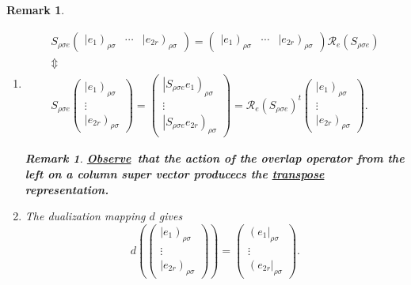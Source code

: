 \documentclass[aps,preprint]{revtex4}
\newtheorem{remark}[theorem]{Remark}
\begin{document}
\begin{remark}
\begin{enumerate}
\begin{enumerate}
\item 
\begin{gather}
S_{\rho \sigma e}\left( 
\begin{array}{ccc}
\left\vert e_{1}\right) _{\rho \sigma } & \cdots & \left\vert e_{2r}\right)
_{\rho \sigma }%
\end{array}%
\right) =\left( 
\begin{array}{ccc}
\left\vert e_{1}\right) _{\rho \sigma } & \cdots & \left\vert e_{2r}\right)
_{\rho \sigma }%
\end{array}%
\right) \mathcal{R}_{e}\left( S_{\rho \sigma e}\right) \\
\Updownarrow \\
S_{\rho \sigma e}\left( 
\begin{array}{c}
\left\vert e_{1}\right) _{\rho \sigma } \\ 
\vdots \\ 
\left\vert e_{2r}\right) _{\rho \sigma }%
\end{array}%
\right) =\left( 
\begin{array}{c}
\left\vert S_{\rho \sigma e}e_{1}\right) _{\rho \sigma } \\ 
\vdots \\ 
\left\vert S_{\rho \sigma e}e_{2r}\right) _{\rho \sigma }%
\end{array}%
\right) =\mathcal{R}_{e}\left( S_{\rho \sigma e}\right) ^{t}\left( 
\begin{array}{c}
\left\vert e_{1}\right) _{\rho \sigma } \\ 
\vdots \\ 
\left\vert e_{2r}\right) _{\rho \sigma }%
\end{array}%
\right) .
\end{gather}

\begin{remark}
\underline{\textbf{Observe}}\textbf{\ that the action of the overlap
operator from the left on a column super vector producecs the \underline{%
\textbf{transpose}} representation. }
\end{remark}

\item The dualization mapping $d$ gives 
\begin{equation}
d\left( \left( 
\begin{array}{c}
\left\vert e_{1}\right) _{\rho \sigma } \\ 
\vdots \\ 
\left\vert e_{2r}\right) _{\rho \sigma }%
\end{array}%
\right) \right) =\left( 
\begin{array}{c}
\left( e_{1}\right\vert _{\rho \sigma } \\ 
\vdots \\ 
\left( e_{2r}\right\vert _{\rho \sigma }%
\end{array}%
\right) .
\end{equation}


\end{enumerate}
\end{enumerate}
\end{remark}
\end{document}
